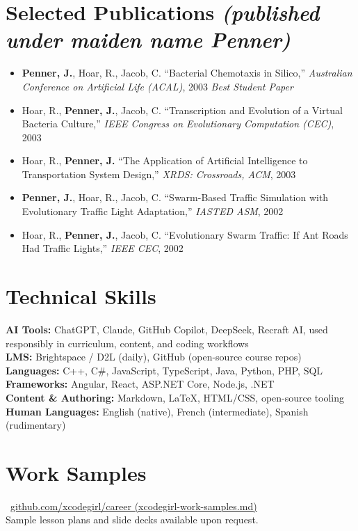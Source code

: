 \documentclass[10pt]{article}
\begin{document}
\section*{Selected Publications \normalfont\small\textit{(published under maiden name Penner)}}
\begin{itemize}[nosep,leftmargin=*]
    \item \textbf{Penner, J.}, Hoar, R., Jacob, C. ``Bacterial Chemotaxis in Silico,'' \textit{Australian Conference on Artificial Life (ACAL)}, 2003 \hfill \textit{Best Student Paper}
    \item Hoar, R., \textbf{Penner, J.}, Jacob, C. ``Transcription and Evolution of a Virtual Bacteria Culture,'' \textit{IEEE Congress on Evolutionary Computation (CEC)}, 2003
    \item Hoar, R., \textbf{Penner, J.} ``The Application of Artificial Intelligence to Transportation System Design,'' \textit{XRDS: Crossroads, ACM}, 2003
    \item \textbf{Penner, J.}, Hoar, R., Jacob, C. ``Swarm-Based Traffic Simulation with Evolutionary Traffic Light Adaptation,'' \textit{IASTED ASM}, 2002
    \item Hoar, R., \textbf{Penner, J.}, Jacob, C. ``Evolutionary Swarm Traffic: If Ant Roads Had Traffic Lights,'' \textit{IEEE CEC}, 2002
\end{itemize}

\section*{Technical Skills}
\textbf{AI Tools:} ChatGPT, Claude, GitHub Copilot, DeepSeek, Recraft AI, used responsibly in curriculum, content, and coding workflows \\
\textbf{LMS:} Brightspace / D2L (daily), GitHub (open-source course repos) \\
\textbf{Languages:} C++, C\#, JavaScript, TypeScript, Java, Python, PHP, SQL \\
\textbf{Frameworks:} Angular, React, ASP.NET Core, Node.js, .NET \\
\textbf{Content \& Authoring:} Markdown, \LaTeX, HTML/CSS, open-source tooling \\
\textbf{Human Languages:} English (native), French (intermediate), Spanish (rudimentary)

\section*{Work Samples}
~\href{https://github.com/xcodegirl/career/blob/main/xcodegirl-work-samples.md}{github.com/xcodegirl/career (xcodegirl-work-samples.md)} \\
Sample lesson plans and slide decks available upon request.
\end{document}
